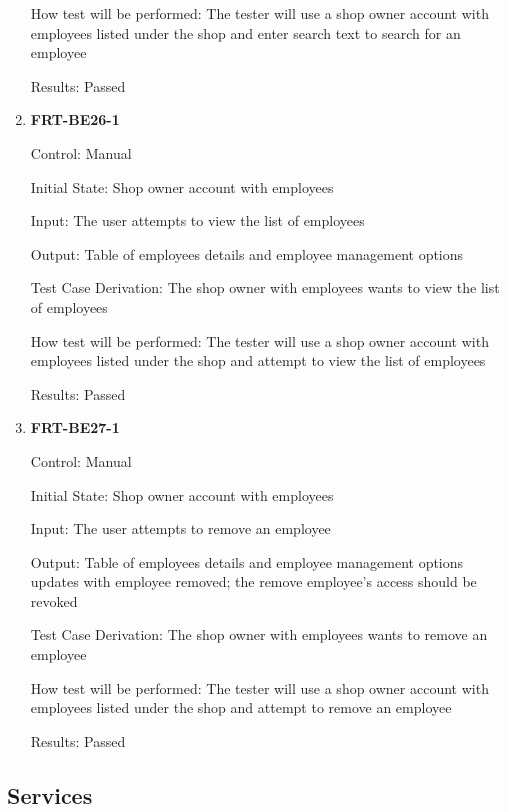 \documentclass[12pt, titlepage]{article}
\begin{document}
\begin{enumerate}
	      How test will be performed: The tester will use a shop owner account with employees listed under
	      the shop and enter search text to search for an employee

	      Results: Passed

	\item \textbf{FRT-BE26-1}

	      Control: Manual

	      Initial State: Shop owner account with employees

	      Input: The user attempts to view the list of employees

	      Output: Table of employees details and employee management options

	      Test Case Derivation: The shop owner with employees wants to view the list of employees

	      How test will be performed: The tester will use a shop owner account with employees listed under
	      the shop and attempt to view the list of employees

	      Results: Passed

	\item \textbf{FRT-BE27-1}

	      Control: Manual

	      Initial State: Shop owner account with employees

	      Input: The user attempts to remove an employee

	      Output: Table of employees details and employee management options updates with employee removed;
	      the remove employee's access should be revoked

	      Test Case Derivation: The shop owner with employees wants to remove an employee

	      How test will be performed: The tester will use a shop owner account with employees listed under
	      the shop and attempt to remove an employee

	      Results: Passed

\end{enumerate}

\subsection{Services}
\end{document}
